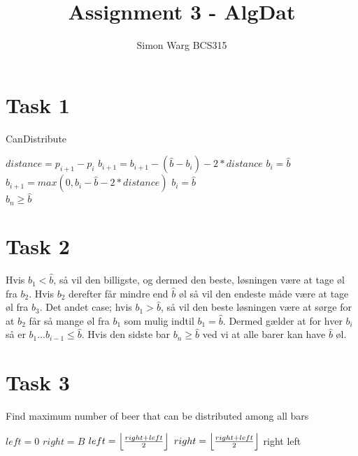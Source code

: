 \documentclass[12pt]{article}
\title{Assignment 3 - AlgDat}
\author{Simon Warg BCS315}
\DeclarePairedDelimiter\floor{\lfloor}{\rfloor}
\begin{document}
\maketitle

\section*{Task 1}
\begin{algorithm}
 \caption{CanDistribute}

 \begin{algorithmic}
        \State $distance = p_{i+1}-p_i$
                \State $b_{i+1} = b_{i+1}- (\hat{b}-b_i) - 2*distance$
                \State $b_i = \hat{b}$
        \EndIf
                \State $b_{i+1} = max(0, b_i - \hat{b} - 2*distance)$
                \State $b_i = \hat{b}$
        \EndIf
   \EndFor \\
\Return $b_n \geq \hat{b}$
\end{algorithmic}
\end{algorithm}

\section*{Task 2}
Hvis $b_1 < \hat{b}$, så vil den billigste, og dermed den beste, løsningen være at tage øl fra $b_2$. Hvis $b_2$ derefter får mindre end $\hat{b}$ øl så vil den endeste måde være at tage øl fra $b_3$. Det andet case; hvis $b_1 > \hat{b}$, så vil den beste løsningen være at sørge for at $b_2$ får så mange øl fra $b_1$ som mulig indtil $b_1 = \hat{b}$. Dermed gælder at for hver $b_i$ så er $b_1...b_{i-1} \leq \hat{b}$. Hvis den sidste bar $b_n \geq \hat{b}$ ved vi at alle barer kan have $\hat{b}$ øl.

\section*{Task 3}
\begin{algorithm}
 \caption{Find maximum number of beer that can be distributed among all bars}

 \begin{algorithmic}
        \State $left = 0$
        \State $right = B$
                \State $left = \floor*{\frac{right+left}{2}}$
        \Else
                \State $right = \floor*{\frac{right+left}{2}}$
        \EndIf
\EndWhile
{}
        \State \Return right
\Else
        \State \Return left
\EndIf

\end{algorithmic}
\end{algorithm}
\end{document}
